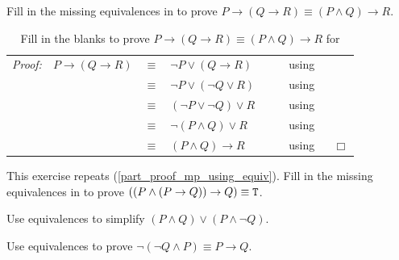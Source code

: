\begin{exer}[\exerU] %
\label{exer_proof_equiv_PtoQtoR}
    Fill in the missing equivalences in  to prove $P \to (Q \to R)\equiv (P \land Q) \to R$.  

    \begin{table}[hbtp]
        \centering
        \begin{tabular} {lrclll}
            \emph{Proof:} & $P \to (Q \to R)$ & $\equiv$ & $\neg P \lor (Q \to R)$ & ~\hspace{.25in}~& using \underline{\hspace{1in}}  \\ 
            & & $\equiv$ & $\neg P \lor (\neg Q \lor R)$ && using \underline{\hspace{1in}}  \\ 
            & & $\equiv$ & $(\neg P \lor \neg Q) \lor R $ && using \underline{\hspace{1in}}  \\ 
            & & $\equiv$ & $\neg(P \land Q) \lor R $ && using \underline{\hspace{1in}}  \\ 
            & & $\equiv$ & $(P \land Q) \to R$ && using \underline{\hspace{1in}} ~ \hfill ~$\Box$ \\ 
\end{tabular}
        \caption{Fill in the blanks to prove $P \to (Q \to R) \equiv (P \land Q) \to R$ for }
        \label{tab_proof_equiv_PtoQtoR}
    \end{table}
\end{exer}

\begin{exer}[\exerU] %
\label{exer_proof_mp_using_equiv}
    This exercise repeats  (\ref{part_proof_mp_using_equiv}).  Fill in the missing equivalences in  to prove $((P \land (P \to Q)) \to Q) \equiv \texttt{T}$.  
\end{exer}

\begin{exer}[\exerU] %
\label{exer_simplify_equiv}
    Use equivalences to simplify $(P \land Q) \lor (P \land \neg Q)$.  
\end{exer}

\begin{exer}[\exerU] %
\label{exer_another_equiv_ifthen}
    Use equivalences to prove $\neg(\neg Q \land P) \equiv P \to Q$.
\end{exer}

